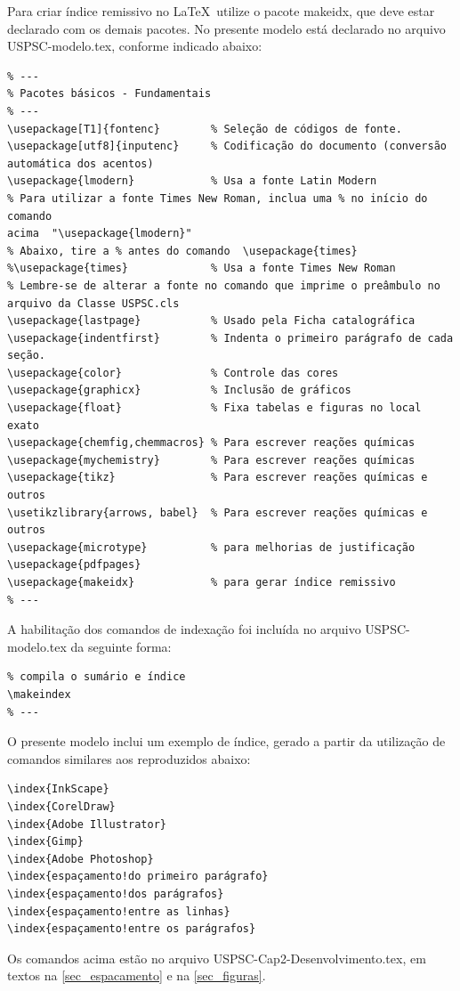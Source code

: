 Para criar índice remissivo no \LaTeX\  utilize o pacote makeidx, que deve estar declarado com os demais pacotes. No presente modelo está declarado no arquivo USPSC-modelo.tex, conforme indicado abaixo:

\begin{verbatim}
% ---
% Pacotes básicos - Fundamentais 
% ---
\usepackage[T1]{fontenc}		% Seleção de códigos de fonte.
\usepackage[utf8]{inputenc}		% Codificação do documento (conversão 
automática dos acentos)
\usepackage{lmodern}			% Usa a fonte Latin Modern
% Para utilizar a fonte Times New Roman, inclua uma % no início do comando 
acima  "\usepackage{lmodern}"
% Abaixo, tire a % antes do comando  \usepackage{times}
%\usepackage{times}		    	% Usa a fonte Times New Roman	
% Lembre-se de alterar a fonte no comando que imprime o preâmbulo no 
arquivo da Classe USPSC.cls				
\usepackage{lastpage}			% Usado pela Ficha catalográfica
\usepackage{indentfirst}		% Indenta o primeiro parágrafo de cada seção.
\usepackage{color}				% Controle das cores
\usepackage{graphicx}			% Inclusão de gráficos
\usepackage{float} 				% Fixa tabelas e figuras no local exato
\usepackage{chemfig,chemmacros} % Para escrever reações químicas
\usepackage{mychemistry}        % Para escrever reações químicas
\usepackage{tikz}				% Para escrever reações químicas e outros
\usetikzlibrary{arrows, babel}	% Para escrever reações químicas e outros
\usepackage{microtype} 			% para melhorias de justificação
\usepackage{pdfpages}
\usepackage{makeidx}            % para gerar índice remissivo
% ---
\end{verbatim}

A habilitação dos comandos de indexação foi incluída no arquivo USPSC-modelo.tex da seguinte forma:


\begin{verbatim}
% compila o sumário e índice
\makeindex
% ---
\end{verbatim}

O presente modelo inclui um exemplo de índice, gerado a partir da utilização de comandos similares aos reproduzidos abaixo:

\begin{verbatim}
\index{InkScape}
\index{CorelDraw}
\index{Adobe Illustrator}
\index{Gimp}
\index{Adobe Photoshop}
\index{espaçamento!do primeiro parágrafo}
\index{espaçamento!dos parágrafos}
\index{espaçamento!entre as linhas}
\index{espaçamento!entre os parágrafos}
\end{verbatim}

Os comandos acima estão no arquivo USPSC-Cap2-Desenvolvimento.tex, em textos na  \autoref{sec_espacamento}  e na  \autoref{sec_figuras}.

